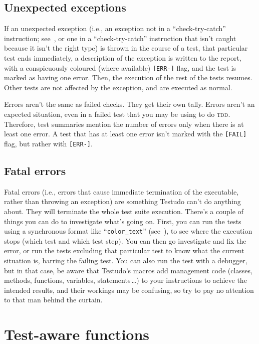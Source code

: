 \documentclass[twoside, a4paper, article]{memoir}
\newcommand*\ellipsis{\,\ldots}
\begin{document}
\section{Unexpected exceptions}
\label{sec:unexpected-exceptions}

If an unexpected exception (i.e., an exception not in a ``check-try-catch''
instruction; see~, or one in a ``check-try-catch''
instruction that isn't caught because it isn't the right type) is thrown in the
course of a test, that particular test ends immediately, a description of the
exception is written to the report, with a conspicuously coloured (where
available) \verb|[ERR-]| flag, and the test is marked as having one error.
Then, the execution of the rest of the tests resumes.  Other tests are not
affected by the exception, and are executed as normal.

Errors aren't the same as failed checks.  They get their own tally.  Errors
aren't an expected situation, even in a failed test that you may be using to do
\textsc{tdd}.  Therefore, test summaries mention the number of errors only
when there is at least one error.  A test that has at least one error isn't
marked with the \verb|[FAIL]| flag, but rather with \verb|[ERR-]|.


\section{Fatal errors}
\label{sec:fatal-errors}

Fatal errors (i.e., errors that cause immediate termination of the executable,
rather than throwing an exception) are something Testudo can't do anything
about.  They will terminate the whole test suite execution.  There's a couple
of things you can do to investigate what's going on.  First, you can run the
tests using a synchronous format like ``\texttt{color\_text}''
(see~), to see where the execution stops (which
test and which test step).  You can then go investigate and fix the error, or
run the tests excluding that particular test to know what the current situation
is, barring the failing test.  You can also run the test with a debugger, but
in that case, be aware that Testudo's macros add management code (classes,
methods, functions, variables, statements\ellipsis{}) to your instructions to
achieve the intended results, and their workings may be confusing, so try to
pay no attention to that man behind the curtain.


\chapter{Test-aware functions}
\label{cha:test-aware-functions}
\end{document}
